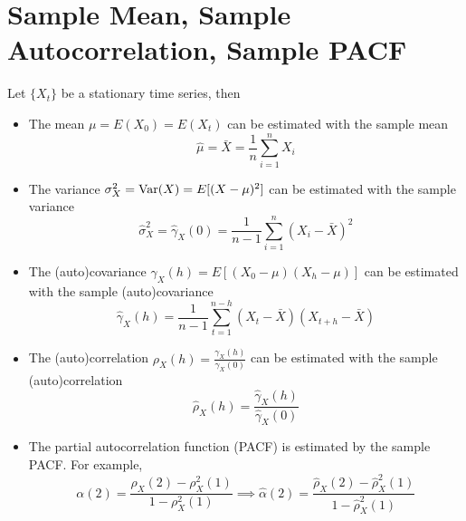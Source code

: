 \section{Sample Mean, Sample Autocorrelation, Sample PACF}

Let $\{X_t\}$ be a stationary time series, then 
\begin{itemize}
    \item The mean $\mu = E(X_0) = E(X_t)$ can be estimated with the sample mean
    \[\hat{\mu} = \bar{X} = \frac{1}{n}\sum_{i=1}^n X_i\]
    \item The variance $\sigma_X^2 = \operatorname{Var}(X) = E[(X-\mu)^2]$ can be estimated with the sample variance
    \[\hat{\sigma}_X^2 = \hat{\gamma}_X(0) = \frac{1}{n-1}\sum_{i=1}^n(X_i-\bar{X})^2\]
    \item The (auto)covariance $\gamma_X(h) = E[(X_0 - \mu)(X_h - \mu)]$ can be estimated with the sample (auto)covariance
    \[\hat{\gamma}_X(h) = \frac{1}{n-1}\sum_{t=1}^{n-h}(X_t - \bar{X})(X_{t+h} - \bar{X})\]
    \item The (auto)correlation $\rho_X(h) = \frac{\gamma_X(h)}{\gamma_X(0)}$ can be estimated with the sample (auto)correlation 
    \[\hat{\rho}_X(h) = \frac{\hat{\gamma}_X(h)}{\hat{\gamma}_X(0)}\]
    \item The partial autocorrelation function (PACF) is estimated by the sample PACF. For example,
    \[\alpha(2) = \frac{\rho_X(2) - \rho^2_X(1)}{1-\rho_X^2(1)} \implies \hat{\alpha}(2) = \frac{\hat{\rho}_X(2) - \hat{\rho}_X^2 (1)}{1 - \hat{\rho}_X^2(1)}\]
\end{itemize}